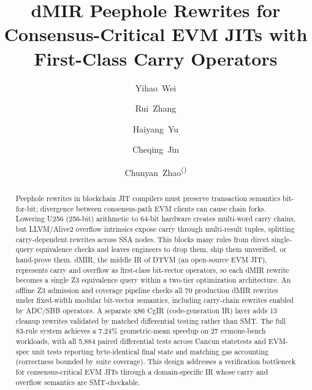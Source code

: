\documentclass[runningheads]{llncs}
\begin{document}
\title{dMIR Peephole Rewrites for Consensus-Critical EVM JITs with First-Class Carry Operators}


\author{Yihao~Wei \and
Rui~Zhang \and
Haiyang~Yu \and
Cheqing~Jin \and
Chunyan~Zhao\textsuperscript{(\Letter)}}

\maketitle

\begin{abstract}
Peephole rewrites in blockchain JIT compilers must preserve transaction semantics bit-for-bit; divergence between consensus-path EVM clients can cause chain forks. Lowering U256 (256-bit) arithmetic to 64-bit hardware creates multi-word carry chains, but LLVM/Alive2 overflow intrinsics expose carry through multi-result tuples, splitting carry-dependent rewrites across SSA nodes. This blocks many rules from direct single-query equivalence checks and leaves engineers to drop them, ship them unverified, or hand-prove them. dMIR, the middle IR of DTVM (an open-source EVM JIT), represents carry and overflow as first-class bit-vector operators, so each dMIR rewrite becomes a single Z3 equivalence query within a two-tier optimization architecture. An offline Z3 admission and coverage pipeline checks all 70 production dMIR rewrites under fixed-width modular bit-vector semantics, including carry-chain rewrites enabled by ADC/SBB operators. A separate x86 CgIR (code-generation IR) layer adds 13 cleanup rewrites validated by matched differential testing rather than SMT. The full 83-rule system achieves a 7.24\% geometric-mean speedup on 27 evmone-bench workloads, with all 5{,}884 paired differential tests across Cancun statetests and EVM-spec unit tests reporting byte-identical final state and matching gas accounting (correctness bounded by suite coverage). This design addresses a verification bottleneck for consensus-critical EVM JITs through a domain-specific IR whose carry and overflow semantics are SMT-checkable.

\end{abstract}





\FloatBarrier





\end{document}
